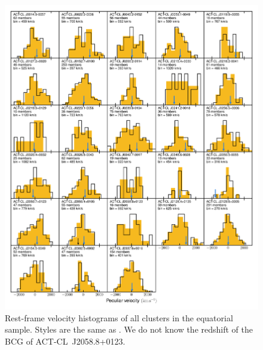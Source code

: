 \begin{figure}
\centerline{\includegraphics[width=5in]{chapter3/histograms_all_equator.pdf}}
\caption{Rest-frame velocity histograms of all clusters in the equatorial sample. Styles are the same as . We do not know the redshift of the BCG of ACT-CL~J2058.8+0123.}
\label{f:hist_eq}
\end{figure}


% 
% 






% 
